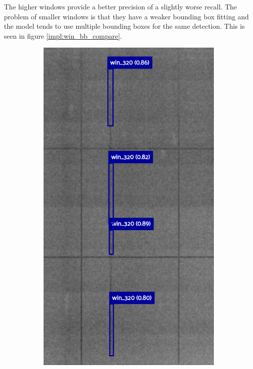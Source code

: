 The higher windows provide a better precision of a slightly worse recall. The problem of smaller windows is that they have a weaker bounding box fitting and the model tends to use multiple bounding boxes for the same detection. This is seen in figure \ref{impl:win_bb_compare}.

\begin{figure}[!h]
\centering
\begin{subfigure}{.5\textwidth}
  \centering
  \includegraphics[width=\linewidth]{images/implementation/results/win/320}

\end{subfigure}
\end{figure}
